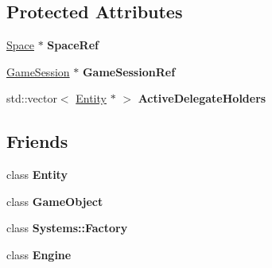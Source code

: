 \subsection*{Protected Attributes}
\begin{DoxyCompactItemize}
\item 
\hypertarget{classDCEngine_1_1Component_a677bd02b725010574d579ff06082b08e}{\hyperlink{classDCEngine_1_1Space}{Space} $\ast$ {\bfseries Space\-Ref}}\label{classDCEngine_1_1Component_a677bd02b725010574d579ff06082b08e}

\item 
\hypertarget{classDCEngine_1_1Component_a5d0b8fc5b9696dba92667550fe3baa2e}{\hyperlink{classDCEngine_1_1GameSession}{Game\-Session} $\ast$ {\bfseries Game\-Session\-Ref}}\label{classDCEngine_1_1Component_a5d0b8fc5b9696dba92667550fe3baa2e}

\item 
\hypertarget{classDCEngine_1_1Component_ad1c8d9740f167555fd95004a8da73ac4}{std\-::vector$<$ \hyperlink{classDCEngine_1_1Entity}{Entity} $\ast$ $>$ {\bfseries Active\-Delegate\-Holders}}\label{classDCEngine_1_1Component_ad1c8d9740f167555fd95004a8da73ac4}

\end{DoxyCompactItemize}
\subsection*{Friends}
\begin{DoxyCompactItemize}
\item 
\hypertarget{classDCEngine_1_1Component_a614439ccac0344926adc4c0165d64060}{class {\bfseries Entity}}\label{classDCEngine_1_1Component_a614439ccac0344926adc4c0165d64060}

\item 
\hypertarget{classDCEngine_1_1Component_a00df87c957d8f7ee0fc51f07a0542f4a}{class {\bfseries Game\-Object}}\label{classDCEngine_1_1Component_a00df87c957d8f7ee0fc51f07a0542f4a}

\item 
\hypertarget{classDCEngine_1_1Component_a160097cc252ed86c269b6147933a7806}{class {\bfseries Systems\-::\-Factory}}\label{classDCEngine_1_1Component_a160097cc252ed86c269b6147933a7806}

\item 
\hypertarget{classDCEngine_1_1Component_a3e1914489e4bed4f9f23cdeab34a43dc}{class {\bfseries Engine}}\label{classDCEngine_1_1Component_a3e1914489e4bed4f9f23cdeab34a43dc}

\end{DoxyCompactItemize}
